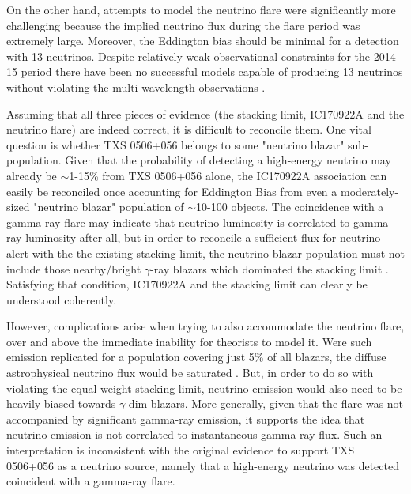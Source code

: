 On the other hand, attempts to model the neutrino flare were significantly more challenging because the implied neutrino flux during the flare period was extremely large. Moreover, the Eddington bias should be minimal for a detection with 13 neutrinos. Despite relatively weak observational constraints for the 2014-15 period there have been no successful models capable of producing 13 neutrinos without violating the multi-wavelength observations .

Assuming that all three pieces of evidence (the stacking limit, IC170922A and the neutrino flare) are indeed correct, it is difficult to reconcile them. One vital question is whether TXS 0506+056 belongs to some "neutrino blazar" sub-population. Given that the probability of detecting a high-energy neutrino may already be $\sim$1-15\% from TXS 0506+056 alone, the IC170922A association can easily be reconciled once accounting for Eddington Bias from even a moderately-sized "neutrino blazar" population of $\sim$10-100 objects. The coincidence with a gamma-ray flare may indicate that neutrino luminosity is correlated to gamma-ray luminosity after all, but in order to reconcile a sufficient flux for neutrino alert with the the existing stacking limit, the neutrino blazar population must not include those nearby/bright $\gamma$-ray blazars which dominated the stacking limit \cite{ic_blazar_17}. Satisfying that condition, IC170922A and the stacking limit can clearly be understood coherently.

However, complications arise when trying to also accommodate the neutrino flare, over and above the immediate inability for theorists to model it. Were such emission replicated for a population covering just 5\% of all blazars, the diffuse astrophysical neutrino flux would be saturated . But, in order to do so with violating the equal-weight stacking limit, neutrino emission would also need to be heavily biased towards $\gamma$-dim blazars. More generally, given that the flare was not accompanied by significant gamma-ray emission, it supports the idea that neutrino emission is not correlated to instantaneous gamma-ray flux. Such an interpretation is inconsistent with the original evidence to support TXS 0506+056 as a neutrino source, namely that a high-energy neutrino was detected coincident with a gamma-ray flare.

